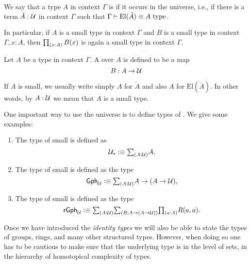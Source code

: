\begin{defn}
We say that a type $A$ in context $\Gamma$ is  if it occurs in the universe, i.e., if there is a term $\check{A}:\mathcal{U}$ in context $\Gamma$ such that $\Gamma\vdash\mathrm{El}(\check{A})\equiv A~\mathrm{type}$.
\end{defn}

In particular, if $A$ is a small type in context $\Gamma$ and $B$ is a small type in context $\Gamma,x:A$, then $\prd{x:A}B(x)$ is again a small type in context $\Gamma$.

\begin{defn}
Let $A$ be a type in context $\Gamma$. A  over $A$ is defined to be a map
\begin{equation*}
B:A\to\mathcal{U}
\end{equation*}
\end{defn}

\begin{rmk}
If $A$ is small, we usually write simply $A$ for $\check{A}$ and also $A$ for $\mathrm{El}(\check{A})$. In other words, by $A:\mathcal{U}$ we mean that $A$ is a small type. 
\end{rmk}

\begin{eg}
One important way to use the universe is to define types of . We give some examples:
\begin{enumerate}
\item The type of small  is defined as
\begin{equation*}
\UU_\ast\defeq \sm{A:\UU}A,
\end{equation*}
\item The type of small  is defined as the type
\begin{equation*}
\mathsf{Gph}_\UU \defeq \sm{A:\UU} A\to (A\to \UU),
\end{equation*}
\item The type of small  is defined as the type
\begin{equation*}
\mathsf{rGph}_\UU \defeq \sm{A:\UU}{R:A\to (A\to \UU)}\prd{a:A}R(a,a).
\end{equation*}
\end{enumerate}
Once we have introduced the \emph{identity types} we will also be able to state the types of groups, rings, and many other structured types. However, when doing so one has to be cautious to make sure that the underlying type is in the level of sets, in the hierarchy of homotopical complexity of types.
\end{eg}

